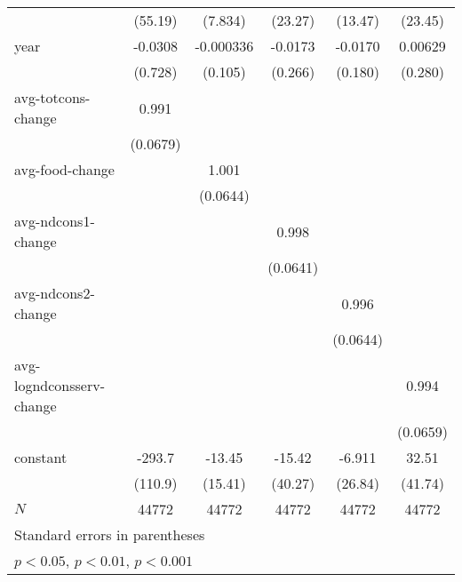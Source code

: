 \begin{table}[!h]
\begin{tabular}{l*{5}{c}}
            &     (55.19)         &     (7.834)         &     (23.27)         &     (13.47)         &     (23.45)         \\
year        &     -0.0308         &   -0.000336         &     -0.0173         &     -0.0170         &     0.00629         \\
            &     (0.728)         &     (0.105)         &     (0.266)         &     (0.180)         &     (0.280)         \\
avg-totcons-change&       0.991\sym{***}&                     &                     &                     &                     \\
            &    (0.0679)         &                     &                     &                     &                     \\            
avg-food-change&                     &       1.001\sym{***}&                     &                     &                     \\
            &                     &    (0.0644)         &                     &                     &                     \\
avg-ndcons1-change&                     &                     &       0.998\sym{***}&                     &                     \\
            &                     &                     &    (0.0641)         &                     &                     \\
avg-ndcons2-change&                     &                     &                     &       0.996\sym{***}&                     \\
            &                     &                     &                     &    (0.0644)         &                     \\
avg-logndconsserv-change&                     &                     &                     &                     &       0.994\sym{***}\\
            &                     &                     &                     &                     &    (0.0659)         \\
constant    &      -293.7\sym{**} &      -13.45         &      -15.42         &      -6.911         &       32.51         \\
            &     (110.9)         &     (15.41)         &     (40.27)         &     (26.84)         &     (41.74)         \\
\hline
\(N\)       &       44772         &       44772         &       44772         &       44772         &       44772         \\
\hline\hline
\multicolumn{6}{l}{\footnotesize Standard errors in parentheses}\\
\multicolumn{6}{l}{\footnotesize \sym{*} \(p<0.05\), \sym{**} \(p<0.01\), \sym{***} \(p<0.001\)}\\
\end{tabular}
\end{table}
